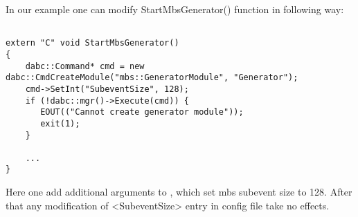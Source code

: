 In our example one can modify StartMbsGenerator() function in following way:

\begin{verbatim}

extern "C" void StartMbsGenerator() 
{
    dabc::Command* cmd = new dabc::CmdCreateModule("mbs::GeneratorModule", "Generator");
    cmd->SetInt("SubeventSize", 128);
    if (!dabc::mgr()->Execute(cmd)) {
       EOUT(("Cannot create generator module"));
       exit(1);
    }
    
    ...
}
\end{verbatim}

Here one add additional arguments to , 
which set mbs subevent size to 128. After that any modification of
<SubeventSize> entry in config file take no effects.

